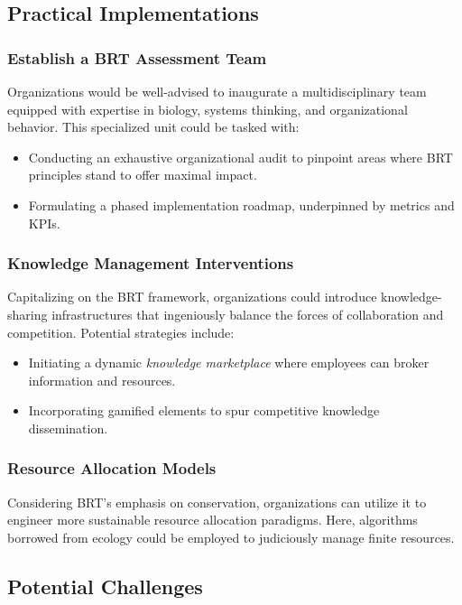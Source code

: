 \documentclass[sn-nature]{sn-jnl}%
\newcommand{\sbt}{\,\begin{picture}(-1,1)(-1,-3)\circle*{3}\end{picture}\ }
\theoremstyle{thmstyleone}%
\theoremstyle{thmstyletwo}%
\theoremstyle{thmstylethree}%
\begin{document}
\subsection{Practical Implementations}

\subsubsection{Establish a BRT Assessment Team}
Organizations would be well-advised to inaugurate a multidisciplinary team equipped with expertise in biology, systems thinking, and organizational behavior. This specialized unit could be tasked with:

\begin{itemize}
    \item[\sbt] Conducting an exhaustive organizational audit to pinpoint areas where BRT principles stand to offer maximal impact.
    \item[\sbt] Formulating a phased implementation roadmap, underpinned by metrics and KPIs.
\end{itemize}

\subsubsection{Knowledge Management Interventions}
Capitalizing on the BRT framework, organizations could introduce knowledge-sharing infrastructures that ingeniously balance the forces of collaboration and competition. Potential strategies include:

\begin{itemize}
    \item[\sbt] Initiating a dynamic \textit{knowledge marketplace} where employees can broker information and resources.
    \item[\sbt] Incorporating gamified elements to spur competitive knowledge dissemination.
\end{itemize}

\subsubsection{Resource Allocation Models}
Considering BRT's emphasis on conservation, organizations can utilize it to engineer more sustainable resource allocation paradigms. Here, algorithms borrowed from ecology could be employed to judiciously manage finite resources.

\subsection{Potential Challenges}
\end{document}

